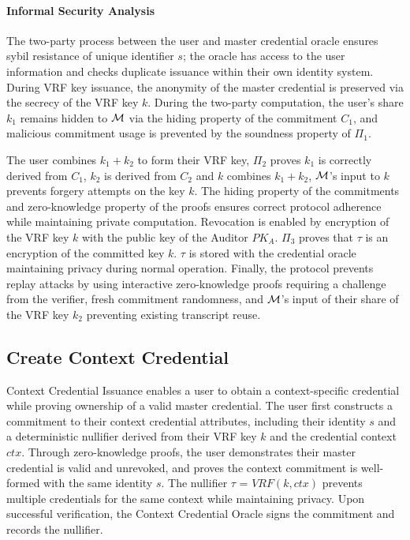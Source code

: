 \paragraph{Informal Security Analysis}

The two-party process between the user and master credential oracle ensures sybil resistance of unique identifier $s$; the oracle has access to the user information and checks duplicate issuance within their own identity system. 
During VRF key issuance, the anonymity of the master credential is preserved via the secrecy of the VRF key $k$. During the two-party computation, the user's share $k_1$ remains hidden to $\mathcal{M}$ via the hiding property of the commitment $C_1$, and malicious commitment usage is prevented by the soundness property of $\Pi_1$. 

\noindent The user combines  $k_1 + k_2$ to form their VRF key, $\Pi_2$ proves $k_1$ is correctly derived from $C_1$, $k_2$ is derived from $C_2$ and $k$ combines $k_1 + k_2$, $\mathcal{M}$'s input to $k$ prevents forgery attempts on the key $k$. The hiding property of the commitments and zero-knowledge property of the proofs ensures correct protocol adherence while maintaining private computation. Revocation is enabled by encryption of the VRF key $k$ with the public key of the Auditor $PK_A$. $\Pi_3$ proves that $\tau$ is an encryption of the committed key $k$. $\tau$ is stored with the credential oracle maintaining privacy during normal operation. Finally, the protocol prevents replay attacks by using interactive zero-knowledge proofs requiring a challenge from the verifier, fresh commitment randomness, and $\mathcal{M}$'s input of their share of the VRF key $k_2$ preventing existing transcript reuse.



\newpage
\subsection{Create Context Credential}
Context Credential Issuance enables a user to obtain a context-specific credential while proving ownership of a valid master credential. The user first constructs a commitment to their context credential attributes, including their identity $s$ and a deterministic nullifier derived from their VRF key $k$ and the credential context $ctx$. Through zero-knowledge proofs, the user demonstrates their master credential is valid and unrevoked, and proves the context commitment is well-formed with the same identity $s$. The nullifier $\tau$ = $VRF(k,ctx)$ prevents multiple credentials for the same context while maintaining privacy. Upon successful verification, the Context Credential Oracle signs the commitment and records the nullifier.

